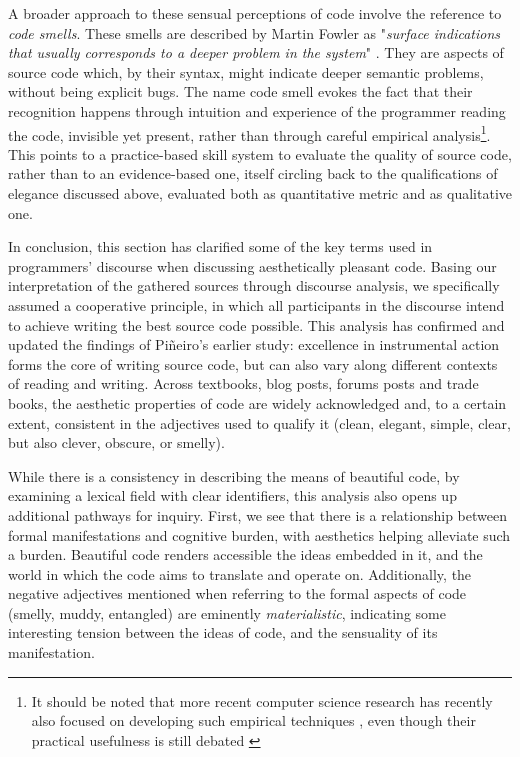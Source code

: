 A broader approach to these sensual perceptions of code involve the reference to \emph{code smells}. These smells are described by Martin Fowler as "\emph{surface indications that usually corresponds to a deeper problem in the system}" \citep{fowler_refactoring_1999}. They are aspects of source code which, by their syntax, might indicate deeper semantic problems, without being explicit bugs. The name code smell evokes the fact that their recognition happens through intuition and experience of the programmer reading the code, \nohyphens{invisible yet present}, rather than through careful empirical analysis\footnote{It should be noted that more recent computer science research has recently also focused on developing such empirical techniques \citep{rasool_review_2015}, even though their practical usefulness is still debated \citep{santos_systematic_2018}}. This points to a practice-based skill system to evaluate the quality of source code, rather than to an evidence-based one, itself circling back to the qualifications of elegance discussed above, evaluated both as quantitative metric and as qualitative one.

\spacersmall

In conclusion, this section has clarified some of the key terms used in programmers' discourse when discussing aesthetically pleasant code. Basing our interpretation of the gathered sources through discourse analysis, we specifically assumed a cooperative principle, in which all participants in the discourse intend to achieve writing the best source code possible. This analysis has confirmed and updated the findings of Piñeiro's earlier study: excellence in instrumental action forms the core of writing source code, but can also vary along different contexts of reading and writing. Across textbooks, blog posts, forums posts and trade books, the aesthetic properties of code are widely acknowledged and, to a certain extent, consistent in the adjectives used to qualify it (clean, elegant, simple, clear, but also clever, obscure, or smelly).

While there is a consistency in describing the means of beautiful code, by examining a lexical field with clear identifiers, this analysis also opens up additional pathways for inquiry. First, we see that there is a relationship between formal manifestations and cognitive burden, with aesthetics helping alleviate such a burden. Beautiful code renders accessible the ideas embedded in it, and the world in which the code aims to translate and operate on. Additionally, the negative adjectives mentioned when referring to the formal aspects of code (smelly, muddy, entangled) are eminently \emph{materialistic}, indicating some interesting tension between the ideas of code, and the sensuality of its manifestation.

